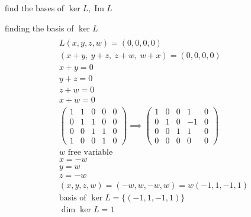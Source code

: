 \documentclass[a4paper,12pt]{article}
\DeclareMathOperator{\img}{Im}
\begin{document}
\begin{definition}
\begin{question}
\begin{subquestion}
find the bases of \(\ker L, \img L\)\\
\begin{answer}
\begin{step}
finding the basis of \(\ker L\)\\
\begin{gather*}\\
  L(x,y,z,w) = (0,0,0,0)\\
  (x+y,\ y+z,\ z+w,\ w+x) = (0,0,0,0)\\
  x+y=0\\
  y+z=0\\
  z+w=0\\
  x+w=0\\
  \left(
    \begin{array}{cccc|c}
      1 & 1 & 0 & 0 & 0\\
      0 & 1 & 1 & 0 & 0\\
      0 & 0 & 1 & 1 & 0\\
      1 & 0 & 0 & 1 & 0
    \end{array}
  \right) \implies
  \left(
    \begin{array}{cccc|c}
      1 & 0 & 0 & 1 & 0\\
      0 & 1 & 0 & -1 & 0\\
      0 & 0 & 1 & 1 & 0\\
      0 & 0 & 0 & 0 & 0
    \end{array}
  \right)\\
  w\text{ free variable}\\
  x=-w\\
  y=w\\
  z=-w\\
  (x,y,z,w) = (-w,w,-w,w) = w(-1,1,-1,1)\\
  \text{basis of } \ker L = \{(-1,1,-1,1)\}\\
  \dim\ker L = 1
\end{gather*}
\end{step}


\end{answer}
\end{subquestion}
\end{question}
\end{definition}
\end{document}
